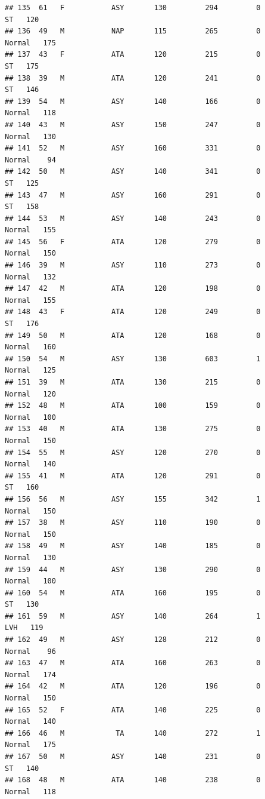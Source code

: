 \documentclass[
]{article}
\begin{document}
\begin{verbatim}
## 135  61   F           ASY       130         294         0         ST   120
## 136  49   M           NAP       115         265         0     Normal   175
## 137  43   F           ATA       120         215         0         ST   175
## 138  39   M           ATA       120         241         0         ST   146
## 139  54   M           ASY       140         166         0     Normal   118
## 140  43   M           ASY       150         247         0     Normal   130
## 141  52   M           ASY       160         331         0     Normal    94
## 142  50   M           ASY       140         341         0         ST   125
## 143  47   M           ASY       160         291         0         ST   158
## 144  53   M           ASY       140         243         0     Normal   155
## 145  56   F           ATA       120         279         0     Normal   150
## 146  39   M           ASY       110         273         0     Normal   132
## 147  42   M           ATA       120         198         0     Normal   155
## 148  43   F           ATA       120         249         0         ST   176
## 149  50   M           ATA       120         168         0     Normal   160
## 150  54   M           ASY       130         603         1     Normal   125
## 151  39   M           ATA       130         215         0     Normal   120
## 152  48   M           ATA       100         159         0     Normal   100
## 153  40   M           ATA       130         275         0     Normal   150
## 154  55   M           ASY       120         270         0     Normal   140
## 155  41   M           ATA       120         291         0         ST   160
## 156  56   M           ASY       155         342         1     Normal   150
## 157  38   M           ASY       110         190         0     Normal   150
## 158  49   M           ASY       140         185         0     Normal   130
## 159  44   M           ASY       130         290         0     Normal   100
## 160  54   M           ATA       160         195         0         ST   130
## 161  59   M           ASY       140         264         1        LVH   119
## 162  49   M           ASY       128         212         0     Normal    96
## 163  47   M           ATA       160         263         0     Normal   174
## 164  42   M           ATA       120         196         0     Normal   150
## 165  52   F           ATA       140         225         0     Normal   140
## 166  46   M            TA       140         272         1     Normal   175
## 167  50   M           ASY       140         231         0         ST   140
## 168  48   M           ATA       140         238         0     Normal   118

\end{verbatim}
\end{document}
